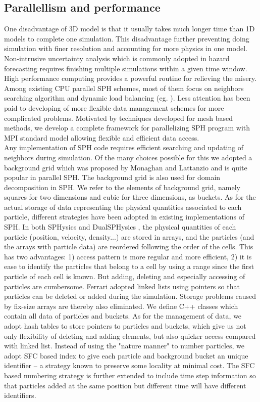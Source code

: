 \documentclass[journal abbreviation, manuscript]{copernicus}
\begin{document}
\subsection{Parallellism and performance}
One disadvantage of 3D model is that it usually takes much longer time than 1D models to complete one simulation. This disadvantage further preventing doing simulation with finer resolution and accounting for more physics in one model. Non-intrusive uncertainty analysis which is commonly adopted in hazard forecasting requires finishing multiple simulations within a given time window. High performance computing provides a powerful routine for relieving the misery. Among existing CPU parallel SPH schemes, most of them focus on neighbors searching algorithm and dynamic load balancing (eg. \citep {ferrari2009new, crespo2015dualsphysics}). Less attention has been paid to developing of more flexible data management schemes for more complicated problems. Motivated by techniques developed for mesh based methods, we develop a complete framework for parallelizing SPH program with MPI standard model allowing flexible and efficient data access.\\
Any implementation of SPH code requires efficient searching and updating of neighbors during simulation. Of the many choices possible for this we adopted a background grid which was proposed by Monaghan and Lattanzio \citep {monaghan1985refined} and is quite popular in parallel SPH. The background grid is also used for domain decomposition in SPH. We refer to the elements of background grid, namely squares for two dimensions and cubic for three dimensions, as buckets. 
As for the actual storage of data representing the physical quantities associated to each particle, different strategies have been adopted in existing implementations of SPH.
In both SPHysics and DualSPHysics \citep {crespo2015dualsphysics}, the physical quantities of each particle (position, velocity, density...) are stored in arrays, and the particles (and the arrays with particle data) are reordered following the order of the cells. This has two advantages: 1) access pattern is more regular and more efficient, 2) it is ease to identify the particles that belong to a cell by using a range since the first particle of each cell is known. But adding, deleting and especially accessing of particles are cumbersome. Ferrari \citep {ferrari2009new} adopted linked lists using pointers so that particles can be deleted or added during the simulation. Storage problems caused by fix-size arrays are thereby also eliminated. We define C++ classes which contain all data of particles and buckets. As for the management of data, we adopt hash tables to store pointers to particles and buckets, which give us not only flexibility of deleting and adding elements, but also quicker access compared with linked list. Instead of using the "nature manner" to number particles, we adopt SFC based index to give each particle and background bucket an unique identifier -- a strategy known to preserve some locality at minimal cost. The SFC based numbering strategy is further extended to include time step information so that particles added at the same position but different time will have different identifiers. 
\end{document}
